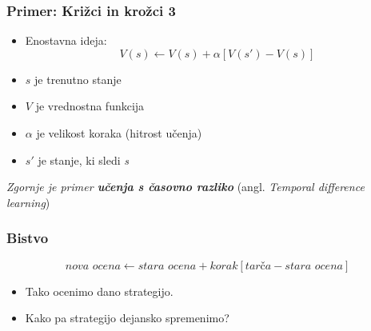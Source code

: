 \documentclass{beamer}    %
\begin{document}
\begin{frame}
    \frametitle{Primer: Križci in krožci 3}
    \begin{itemize}
        \item Enostavna ideja:                                  
        $$
        V(s) \leftarrow V(s) + \alpha [V(s') - V(s)]
        $$
        \pause
        \item $s$ je trenutno stanje                     
        \pause
        \item $V$ je vrednostna funkcija                 
        \pause
        \item $\alpha$ je velikost koraka (hitrost učenja) 
        \pause
        \item $s'$ je stanje, ki sledi \textit{s}   
    \end{itemize}
    \medskip
    \emph{Zgornje je primer \textbf{učenja s časovno razliko}} (angl. \textit{Temporal difference learning})
\end{frame}


\begin{frame}
    \frametitle{Bistvo}
    $$
    \textit{nova ocena} \leftarrow \textit{stara ocena} + \textit{korak} 
    [\textit{tarča} - \textit{stara ocena}]
    $$
    \medskip
    \begin{itemize}
        \item Tako ocenimo dano strategijo.
        \item Kako pa strategijo dejansko spremenimo?
    \end{itemize}
\end{frame}
\end{document}
